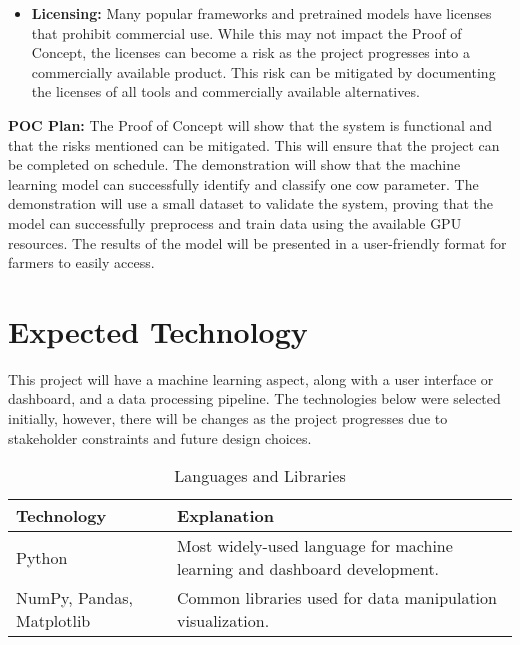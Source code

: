 \documentclass{article}
\begin{document}
\begin{itemize}
  \item \noindent \textbf{Licensing:} Many popular frameworks and pretrained models have licenses that prohibit commercial use. While this may not impact the Proof of Concept, the licenses can become a risk as the project progresses into a commercially available product. This risk can be mitigated by documenting the licenses of all tools and commercially available alternatives.
\end{itemize}

\noindent \textbf{POC Plan:} The Proof of Concept will show that the system is functional and that the risks mentioned can be mitigated. This will ensure that the project can be completed on schedule. 
The demonstration will show that the machine learning model can successfully identify and classify one cow parameter. The demonstration will use a small dataset to validate the system, proving that the model can successfully preprocess and train data using the available GPU resources. The results of the model will be presented in a user-friendly format for farmers to easily access. 

\section{Expected Technology}

This project will have a machine learning aspect, along with a user interface or dashboard, and a data processing pipeline. The technologies below were selected initially, however, there will be changes as the project progresses due to stakeholder constraints and future design choices.

\begin{table}[H]
\caption{Languages and Libraries} \label{TblLanguagesAndLibraries}
\begin{tabularx}{\textwidth}{p{3.5cm}p{7cm}}
\toprule
\textbf{Technology} & \textbf{Explanation}\\
\midrule
Python & Most widely-used language for machine learning and dashboard development.\\
\addlinespace
NumPy, Pandas, Matplotlib & Common libraries used for data manipulation visualization.\\
\bottomrule
\end{tabularx}
\end{table}
\end{document}
